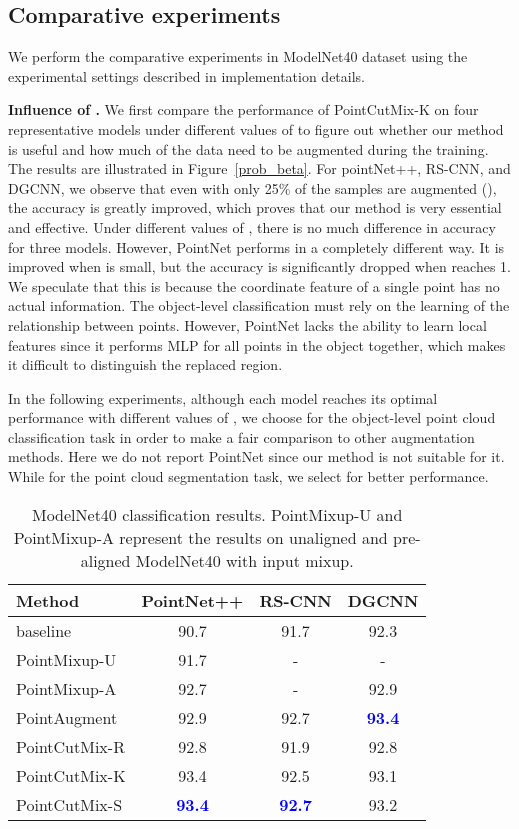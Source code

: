 \documentclass{article}
\begin{document}
\subsection{Comparative experiments}
We perform the comparative experiments in ModelNet40 dataset using the experimental settings described in implementation details.

\textbf{Influence of .} 
We first compare the performance of PointCutMix-K on four representative models under different values of  to figure out whether our method is useful and how much of the data need to be augmented during the training. The results are illustrated in Figure~\ref{prob_beta}.
For pointNet++, RS-CNN, and DGCNN, we observe that even with only 25\% of the samples are augmented (), the accuracy is greatly improved, which proves that our method is very essential and effective. Under different values of , there is no much difference in accuracy for three models.
However, PointNet performs in a completely different way. It is improved when  is small, but the accuracy is significantly dropped when  reaches 1. We speculate that this is because the coordinate feature of a single point has no actual information. The object-level classification must rely on the learning of the relationship between points. However, PointNet lacks the ability to learn local features since it performs MLP for all points in the object together, which makes it difficult to distinguish the replaced region. 


In the following experiments, although each model reaches its optimal performance with different values of , we choose  for the object-level point cloud classification task in order to make a fair comparison to other augmentation methods. Here we do not report PointNet since our method is not suitable for it. While for the point cloud segmentation task, we select  for better performance.


\begin{table}[t]
\centering
\setlength{\tabcolsep}{1.8mm}
\caption{ModelNet40 classification results. PointMixup-U and PointMixup-A represent the results on unaligned and pre-aligned ModelNet40 with input mixup.}
\label{mn40result}
\vspace{1mm}
\begin{tabular}{l c c c}
\toprule
Method & PointNet++ & RS-CNN & DGCNN \\
\midrule
baseline & 90.7 & 91.7 & 92.3 
\\
PointMixup-U & 91.7 & - & -
\\
PointMixup-A & 92.7 & - & 92.9
\\
PointAugment & 92.9 & 92.7 & \textcolor{blue}{\textbf{93.4}}
\\
\midrule
PointCutMix-R & 92.8 & 91.9 & 92.8
\\
PointCutMix-K & 93.4 & 92.5 & 93.1
\\
PointCutMix-S & \textcolor{blue}{\textbf{93.4}} & \textcolor{blue}{\textbf{92.7}} & 93.2
\\
\bottomrule
\end{tabular}
\end{table}
\end{document}
